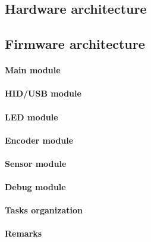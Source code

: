 \documentclass[a4paper,10pt]{article}
\begin{document}
\begin{multicols}{2}
\TODO


\subsection{Hardware architecture}

\TODO


\subsection{Firmware architecture}

\TODO


\paragraph{Main module}
\TODO


\paragraph{HID/USB module}
\TODO


\paragraph{LED module}
\TODO


\paragraph{Encoder module}
\TODO


\paragraph{Sensor module}
\TODO


\paragraph{Debug module}
\TODO


\paragraph{Tasks organization}
\TODO


\paragraph{Remarks}
\TODO



\end{multicols}
\end{document}
